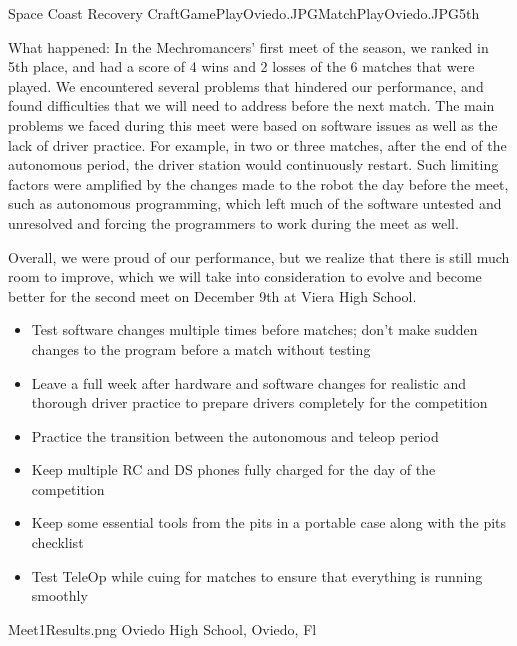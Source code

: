  {Space Coast Recovery Craft}{GamePlayOviedo.JPG}{MatchPlayOviedo.JPG}{5th} 
{What happened:
In the Mechromancers’ first meet of the season, we ranked in 5th place, and had a score of 4 wins and 2 losses of the 6 matches that were played. We encountered several problems that hindered our performance, and found difficulties that we will need to address before the next match. The main problems we faced during this meet were based on software issues as well as the lack of driver practice. For example, in two or three matches, after the end of the autonomous period, the driver station would continuously restart. Such limiting factors were amplified by the changes made to the robot the day before the meet, such as autonomous programming, which left much of the software untested and unresolved and forcing the programmers to work during the meet as well. 

Overall, we were proud of our performance, but we realize that there is still much room to improve, which we will take into consideration to evolve and become better for the second meet on December 9th at Viera High School.

}
{
  \begin{itemize}
      \item Test software changes multiple times before matches; don't make sudden changes to the program before a match without testing
      \item Leave a full week after hardware and software changes for realistic and thorough driver practice to prepare drivers completely for the competition
      \item Practice the transition between the autonomous and teleop period 
      \item Keep multiple RC and DS phones fully charged for the day of the competition
      \item Keep some essential tools from the pits in a portable case along with the pits checklist 
      \item Test TeleOp while cuing for matches to ensure that everything is running smoothly
  \end{itemize} 
}
{Meet1Results.png}
{Oviedo High School, Oviedo, Fl}

